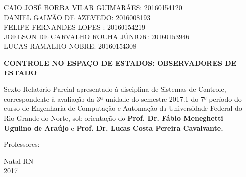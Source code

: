 \documentclass[a4paper,12pt]{article}
\begin{document}
\newpage


\thispagestyle{empty}

\begin{center}
\begin{normalsize}
CAIO JOSÉ BORBA VILAR GUIMARÃES:  20160154120 \\
\vspace{0.8cm}
DANIEL GALVÃO DE AZEVEDO: 2016008193 \\
\vspace{0.8cm}
FELIPE FERNANDES LOPES : 20160154219 \\
\vspace{0.8cm}
JOELSON DE CARVALHO ROCHA JÚNIOR: 20160153946\\
\vspace{0.8cm}
 LUCAS RAMALHO NOBRE: 20160154308\\

\end{normalsize}
\end{center}
\vspace{3cm}

{\bf{\large {\centering CONTROLE NO ESPAÇO DE ESTADOS: OBSERVADORES DE ESTADO\\}}}

\vspace{4cm}

\begin{adjustwidth}{7.5cm}{0cm}

{\normalsize

Sexto Relatório Parcial apresentado à disciplina de
Sistemas de Controle, correspondente à
avaliação da 3ª unidade do semestre 2017.1 do 7º período
do curso de Engenharia de Computação e Automação da
Universidade Federal do Rio Grande do Norte, sob
orientação do {\bf Prof. Dr. Fábio Meneghetti Ugulino de
Araújo }e {\bf Prof. Dr. Lucas Costa Pereira Cavalvante.}

}

\end{adjustwidth}

\vspace{2cm}

\begin{center}

Professores:  \\ 

\vspace{1.0cm}

{\large Natal-RN\\
2017}

\end{center}
\end{document}
